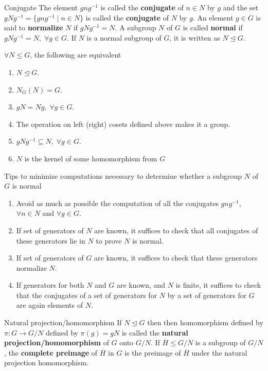 \documentclass[titlepage, 12pt]{article}
\begin{document}
\begin{definition}{Conjugate}{}
    The element $gng^{-1}$ is called the \textbf{conjugate} of $n\in N$ by $g$
    and the set $gNg^{-1} = \{gng^{-1}\;|\;n\in N\}$ is called the
    \textbf{conjugate} of $N$ by $g$. An element $g\in G$ is said to
    \textbf{normalize} $N$ if $gNg^{-1} = N$. A subgroup $N$ of $G$ is called
    \textbf{normal} if $gNg^{-1} = N,\;\forall g\in G$. If $N$ is a normal
    subgroup of $G$, it is written as $N\trianglelefteq G$.
\end{definition}
\begin{theorem}{}{}
    $\forall N\le G$, the following are equivalent
    \begin{enumerate}
        \item $N\trianglelefteq G$.
        \item $N_G(N) = G$.
        \item $gN = Ng,\;\forall g\in G$.
        \item The operation on left (right) cosets defined above makes it a
            group.
        \item $gNg^{-1}\subseteq N,\;\forall g\in G$.
        \item $N$ is the kernel of some homomorphism from $G$
    \end{enumerate}
\end{theorem}
Tips to minimize computations necessary to determine whether a subgroup $N$ of
$G$ is normal
\begin{enumerate}
    \item Avoid as much as possible the computation of all the conjugates
        $gng^{-1}$, $\forall n\in N$ and $\forall g\in G$.
    \item If set of generators of $N$ are known, it suffices to check that all
        conjugates of these generators lie in $N$ to prove $N$ is normal.
    \item If set of generators of $G$ are known, it suffices to check that these
        generators normalize $N$.
    \item If generators for both $N$ and $G$ are known, and $N$ is finite, it
        suffices to check that the conjugates of a set of generators for $N$ by
        a set of generators for $G$ are again elements of $N$.
\end{enumerate}
\begin{definition}{Natural projection/homomorphism}{}
    If $N\trianglelefteq G$ then then homomorphism defined by $\pi:G\rightarrow
    G/N$ defined by $\pi(g) = gN$ is called the \textbf{natural
    projection/homomorphism} of $G$ onto $G/N$. If $\overline H\le G/N$ is a
    subgroup of $G/N$, the \textbf{complete preimage} of $\overline H$ in $G$ is
    the preimage of $\overline H$ under the natural projection homomorphism.
\end{definition}
\end{document}
